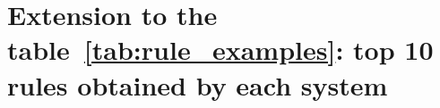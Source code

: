 \documentclass{article}
\begin{document}
\section{Extension to the table~\ref{tab:rule_examples}: top 10 rules obtained by each system}

\large{
    
\begin{table}[h!]
\caption{Examples of top rules obtained by each system learned on \textit{family} dataset}
\label{tab:rule_examples_appendix}
\centering
{}
\end{table}}
\end{document}
